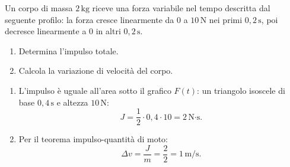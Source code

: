 \begin{question}[ID=1.3, subtitle={Impulso da una forza triangolare nel tempo}, tags={impulso, forza variabile, grafico forza-tempo}, difficulty=media]
Un corpo di massa \(2 \, \text{kg}\) riceve una forza variabile nel tempo descritta dal seguente profilo: la forza cresce linearmente da \(0\) a \(10 \, \text{N}\) nei primi \(0{,}2 \, \text{s}\), poi decresce linearmente a \(0\) in altri \(0{,}2 \, \text{s}\).
\begin{enumerate}
    \item Determina l'impulso totale.
    \item Calcola la variazione di velocità del corpo.
\end{enumerate}
\begin{solution}
    \begin{enumerate}
        \item L'impulso è uguale all'area sotto il grafico \(F(t)\): un triangolo isoscele di base \(0{,}4 \, \text{s}\) e altezza \(10 \, \text{N}\):
        \[
            J = \frac{1}{2} \cdot 0{,}4 \cdot 10 = 2 \, \text{N·s}.
        \]
        \item Per il teorema impulso-quantità di moto:
        \[
            \Delta v = \frac{J}{m} = \frac{2}{2} = 1 \, \text{m/s}.
        \]
    \end{enumerate}
\end{solution}
\end{question}


